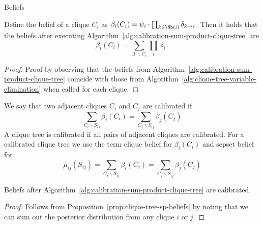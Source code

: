 \begin{frame}{Beliefs}
\begin{proposition}[Beliefs]
\label{prop:clique-tree-sp-beliefs}
    Define the belief of a clique $C_i$ as
    $\beta_i(C_i) = \psi_i \cdot \prod_{k \in \Nb(i)} \delta_{k \rightarrow i}$.
    Then it holds that the beliefs after executing Algorithm~\ref{alg:calibration-sum-product-clique-tree} are
    \begin{equation}
        \beta_i(C_i) = \sum_{\mathcal{X} \backslash C_i} \prod_{i} \phi_i \,.
    \end{equation}
\end{proposition}
\pause
\begin{proof}
    Proof by observing that the beliefs from Algorithm~\ref{alg:calibration-sum-product-clique-tree} coincide with those from Algorithm~\ref{alg:clique-tree-variable-elimination} when called for each clique.
\end{proof}
\pause
\begin{definition}
    \label{def:calibrated-messages}
    We say that two adjacent cliques $C_i$ and $C_j$ are calibrated if
    \begin{equation}
        \label{eq:calibrated-beliefs}
        \sum_{C_i \backslash S_{ij}} \beta_i(C_i) = \sum_{C_j \backslash S_{ij}} \beta_j(C_j)
    \end{equation}
    \pause
    A clique tree is calibrated if all pairs of adjacent cliques are calibrated.
    \pause
    For a calibrated clique tree we use the term clique belief for $\beta_i(C_i)$ and sepset belief for
    \begin{equation}
        \mu_{ij}(S_{ij}) =
        \sum_{C_i \backslash S_{ij}} \beta_i(C_i) = \sum_{C_j \backslash S_{ij}} \beta_j(C_j)
    \end{equation}
\end{definition}
\pause
\begin{corollary}
Beliefs after Algorithm~\ref{alg:calibration-sum-product-clique-tree} are calibrated.
\end{corollary}
\pause
\begin{proof}
Follows from Proposition~\ref{prop:clique-tree-sp-beliefs} by noting that we can sum out the posterior distribution from any clique $i$ or $j$.
\end{proof}
\end{frame}

